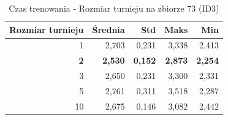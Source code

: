\begin{table}[htbp]
\centering
\small
\setlength{\tabcolsep}{6pt}
\renewcommand{\arraystretch}{1.2}
\caption{Czas trenowania - Rozmiar turnieju na zbiorze 73 (ID3)}
\label{tab:ID3_tournament_size_73_time}
\begin{tabular}{r|r|r|r|r}
\toprule
Rozmiar turnieju & Średnia & Std & Maks & Min \\
\hline
1 & 2,703 & 0,231 & 3,338 & 2,413 \\
\textbf{2} & \textbf{2,530} & \textbf{0,152} & \textbf{2,873} & \textbf{2,254} \\
3 & 2,650 & 0,231 & 3,300 & 2,331 \\
5 & 2,761 & 0,311 & 3,518 & 2,287 \\
10 & 2,675 & 0,146 & 3,082 & 2,442 \\
\bottomrule
\end{tabular}
\end{table}